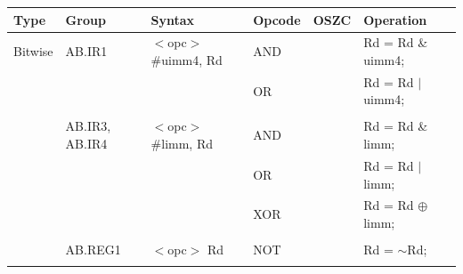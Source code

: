 \clearpage
\begin{table}
\begin{subtable}{\linewidth}
\begin{center}
\scriptsize
\setlength{\tabcolsep}{4pt}
\begin{tabular}{llllll}
\hline
Type               & Group             & Syntax                                & Opcode            & OSZC              & Operation                                                                     \\ \hline
Bitwise            & AB.IR1            & $<$opc$>$ \#uimm4, Rd                 & AND               & \flags{-**-}      & Rd = Rd \& uimm4;                                                             \\
                   &                   &                                       & OR                & \flags{-**-}      & Rd = Rd $\mid$ uimm4;                                                         \\
                   &                   &                                       &                   &                   &                                                                               \\
                   & AB.IR3, AB.IR4    & $<$opc$>$ \#limm, Rd                  & AND               & \flags{-**-}      & Rd = Rd \& limm;                                                              \\
                   &                   &                                       & OR                & \flags{-**-}      & Rd = Rd $\mid$ limm;                                                          \\
                   &                   &                                       & XOR               & \flags{-**-}      & Rd = Rd $\oplus$ limm;                                                        \\
                   &                   &                                       &                   &                   &                                                                               \\
                   & AB.REG1           & $<$opc$>$ Rd                          & NOT               & \flags{-**-}      & Rd = $\sim$Rd;                                                                \\
                   &                   &                                       &                   &                   &                                                                               \\

\end{tabular}
\end{center}
\end{subtable}
\end{table}
